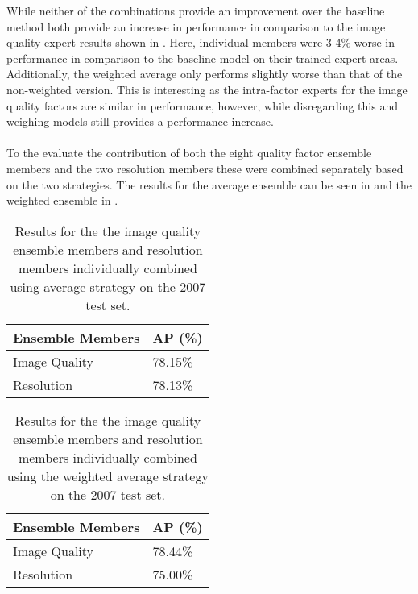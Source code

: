 \documentclass[a4paper,twoside]{article}
\begin{document}
While neither of the combinations provide an improvement over the baseline method both provide an increase in performance in comparison to the image quality expert results shown in . Here, individual members were 3-4\% worse in performance in comparison to the baseline model on their trained expert areas. Additionally, the weighted average only performs slightly worse than that of the non-weighted version. This is interesting as the intra-factor experts for the image quality factors are similar in performance, however, while disregarding this and weighing models still provides a performance increase.
\\\\
To the evaluate the contribution of both the eight quality factor ensemble members and the two resolution members these were combined separately based on the two strategies. The results for the average ensemble can be seen in  and the weighted ensemble in .

\begin{table}[h]
\centering
\caption{Results for the the image quality ensemble members and resolution members individually combined using average strategy on the 2007 test set.}
\label{tab:avgresind}
\begin{tabular}{|l|l|}
\hline
\textbf{Ensemble Members}        & \textbf{AP (\%)} \\ \hline
Image Quality & 78.15\% \\ \hline
Resolution    & 78.13\% \\ \hline
\end{tabular}
\end{table}

\begin{table}[h]
\centering
\caption{Results for the the image quality ensemble members and resolution members individually combined using the weighted average strategy on the 2007 test set.}
\label{tab:weiavgind}
\begin{tabular}{|l|l|}
\hline
\textbf{Ensemble Members}        & \textbf{AP (\%)} \\ \hline
Image Quality & 78.44\% \\ \hline
Resolution    & 75.00\% \\ \hline
\end{tabular}
\end{table}
\end{document}
